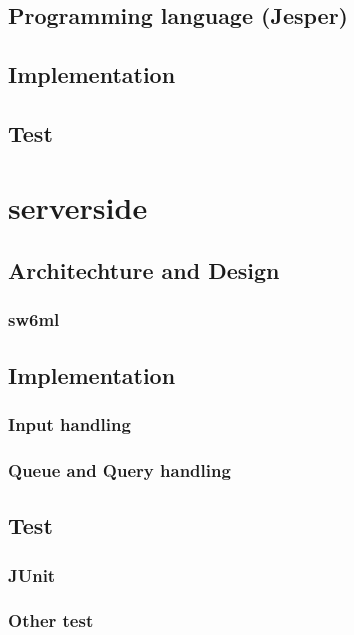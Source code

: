      \subsection{Programming language (Jesper)}
      
     \subsection{Implementation}
     \subsection{Test}

  \section{serverside} %
    
    \subsection{Architechture and Design}
      
      \subsubsection{sw6ml} %
         \label{sw6ml}
	  
	  
    \subsection{Implementation}
      \subsubsection{Input handling} %
		
      \subsubsection{Queue and Query handling} %
	  \label{QQHandling}
	    
    \subsection{Test}
      \subsubsection{JUnit}
      \subsubsection{Other test}

